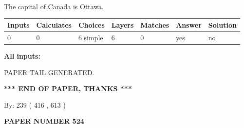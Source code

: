 \documentclass[12pt]{article}
\begin{document}
 
The capital of Canada is Ottawa.
 
 
\noindent{}
 
 
   
   
   
   
\noindent\begin{tabular}{|l|l|l|l|l|l|l|}
 \hline
Inputs & Calculates & Choices & Layers & Matches & Answer & Solution \\ \hline
 0  & 
 0  & 
 6
  simple  
  & 
 6  & 
 0  & 
  yes & 
  no 
  \\ \hline
 \end{tabular}
   
   
   
   
\noindent{}
   
   
   
   
\noindent\vspace{0.1in}\hspace{-0.08in} {\textbf{\Large{All inputs: }}}
   
   
   
   
   
   
 \vspace{0.2in}
 
   
   
\vspace{2.0in} PAPER TAIL GENERATED.
   
   
   
   
\vspace{1.0in} 
{\textbf{\large{ *** END OF PAPER, THANKS *** }}} 
   
   
\hspace{1.0in} By: 
 239 ( 416 ,  613 )
   
   
   
   
\newpage 
\setcounter{page}{ 
   524001 } 
   
   
   
   
 {\textbf{ \Large{ PAPER NUMBER  524  }}}
   
   
\vspace{0.2in}
   
   
   
   
   
   
   
\end{document}
